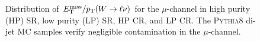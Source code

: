 \begin{figure}[h!tb]
\caption[Distribution of $\MET/\pT(W\ra \mu \nu)$ including a di-jet Monte Carlo sample]{Distribution of $E_{\text{T}}^{\text{miss}}/p_{\text{T}}(W\rightarrow\ell\nu)$ for the $\mu$-channel in \protect{} high purity (HP) SR, \protect{} low purity (LP) SR, \protect{} HP \Wjets CR, and \protect{} LP \Wjets CR. The \textsc{Pythia8} di-jet MC samples verify negligible contamination in the $\mu$-channel.}
\label{fig:metpt_mu}
\end{figure}

